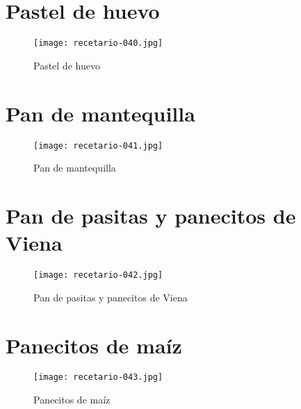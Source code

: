 \documentclass[12pt,letterpaper]{article}
\begin{document}
\newpage

\section{Pastel de huevo}

  \begin{figure}[H]
    \vspace{2pt}
  \texttt{[image: recetario-040.jpg]}
    \caption{Pastel de huevo}
    
  \end{figure}

\newpage

\section{Pan de mantequilla}

  \begin{figure}[H]
    \vspace{2pt}
  \texttt{[image: recetario-041.jpg]}
    \caption{Pan de mantequilla}
    
  \end{figure}

\newpage

\section{Pan de pasitas y panecitos de Viena}

  \begin{figure}[H]
    \vspace{2pt}
  \texttt{[image: recetario-042.jpg]}
    \caption{Pan de pasitas y panecitos de Viena}
    
  \end{figure}

\newpage

\section{Panecitos de maíz}

  \begin{figure}[H]
    \vspace{2pt}
  \texttt{[image: recetario-043.jpg]}
    \caption{Panecitos de maíz}
    
  \end{figure}
\end{document}
